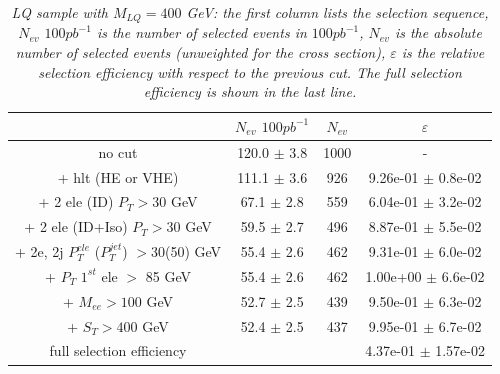 \begin{table}[htbp]
\begin{center}
\begin{tabular}{|c|c|c|c|}
\hline
\hline
 & $N_{ev}$ $100pb^{-1}$ & $N_{ev}$ & $\varepsilon$ \\
\hline
\hline

no cut &120.0 $\pm$ 3.8 & 1000 & - \\
+ hlt (HE or VHE) &111.1 $\pm$ 3.6& 926 & 9.26e-01 $\pm$ 0.8e-02\\
+ 2 ele (ID) $P_{T} >30$ GeV &67.1 $\pm$ 2.8& 559 & 6.04e-01 $\pm$ 3.2e-02\\
+ 2 ele (ID+Iso) $P_{T} >30$ GeV &59.5 $\pm$ 2.7& 496 & 8.87e-01 $\pm$ 5.5e-02\\
+ 2e, 2j $P_{T}^{ele}$ ($P_{T}^{jet}$) $>$30(50) GeV &55.4 $\pm$ 2.6& 462 & 9.31e-01 $\pm$ 6.0e-02\\
+ $P_{T}$ $1^{st}$ ele $>$ 85 GeV &55.4 $\pm$ 2.6& 462 & 1.00e+00 $\pm$ 6.6e-02\\
+ $M_{ee} >100$ GeV&52.7 $\pm$ 2.5& 439 & 9.50e-01 $\pm$ 6.3e-02\\
+ $S_{T} >400$ GeV &52.4 $\pm$ 2.5& 437 & 9.95e-01 $\pm$ 6.7e-02\\
\hline

full selection efficiency& &  & 4.37e-01 $\pm$ 1.57e-02\\
\hline
\end{tabular}
\end{center}
\caption{\small \sl LQ sample with $M_{LQ}=400$ GeV: the first column lists the selection sequence, $N_{ev}$ $100pb^{-1}$ is the number of selected events in $100pb^{-1}$, $N_{ev}$ is the absolute number of selected events (unweighted for the cross section), $\varepsilon$ is the relative selection efficiency with respect to the previous cut. The full selection efficiency is shown in the last line.}
\label{tab:selection_effic_400}
\end{table}


